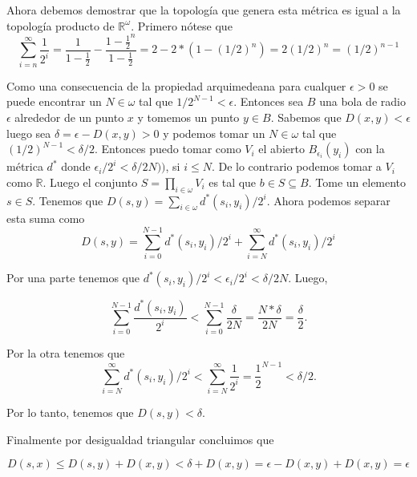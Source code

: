 \documentclass[letter,twoside,12pt]{article}
\begin{document}
\begin{enumerate}
Ahora debemos demostrar que la topología que genera esta métrica es igual a la topología producto de $ \mathbb{R}^\omega $. Primero nótese que 
\begin{equation}
\sum_{i =n}^{\infty} \frac{1}{2^i} = \frac{1}{1-\frac{1}{2}}-\frac{1-\frac{1}{2}^n}{1-\frac{1}{2}}= 2-2*(1-(1/2)^n)=2(1/2)^n=(1/2)^{n-1} \nonumber
\end{equation}

Como una consecuencia de la propiedad arquimedeana para cualquer $ \epsilon > 0 $ se puede encontrar un $ N \in \omega $ tal que $ 1/2^{N-1} < \epsilon$. Entonces sea $ B $ una bola de radio $ \epsilon $ alrededor de un punto $ x $ y tomemos un punto $ y \in B $. Sabemos que $ D(x,y)<\epsilon $ luego sea $ \delta = \epsilon-D(x,y)>0 $ y podemos tomar un $N \in \omega$ tal que $ (1/2)^{N-1} <\delta/2$. Entonces puedo tomar como $ V_i $ el abierto $ B_{\epsilon_i}(y_i)$ con la métrica $ d^* $ donde  $\epsilon_i/2^i<\delta/2N))$, si $ i \leq N $. De lo contrario podemos tomar a $ V_i $ como $ \mathbb{R} $. Luego el conjunto $ S = \prod_{i \in \omega} V_i$ es tal que $ b \in S \subseteq B $. Tome un elemento $ s \in S $. Tenemos que $ D(s,y) = \sum_{i \in \omega}d^*(s_i,y_i)/2^i$. Ahora podemos separar esta suma como
\begin{equation}
D(s,y) = \sum_{i=0}^{N-1}d^*(s_i,y_i)/2^i +  \sum_{i=N}^{\infty}d^*(s_i,y_i)/2^i \nonumber
\end{equation}

Por una parte tenemos que $ d^*(s_i,y_i)/2^i < \epsilon_i/2^i<\delta/2N$. Luego,

\begin{equation}
\sum_{i=0}^{N-1}\frac{d^*(s_i,y_i)}{2^i} < \sum_{i=0}^{N-1} \frac{\delta}{2N} = \frac{N*\delta}{2N} = \frac{\delta}{2}. \nonumber
\end{equation}

Por la otra tenemos que
\begin{equation}
\sum_{i=N}^{\infty}d^*(s_i,y_i)/2^i < \sum_{i=N}^{\infty}\frac{1}{2^i}=\frac{1}{2}^{N-1}<\delta/2. \nonumber
\end{equation}

Por lo tanto, tenemos que $ D(s,y)<\delta $.

Finalmente por desigualdad triangular concluimos que

\begin{equation}
D(s,x) \leq D(s,y)+D(x,y) < \delta+D(x,y)=\epsilon-D(x,y)+D(x,y) =\epsilon\nonumber
\end{equation}


\end{enumerate}
\end{document}
